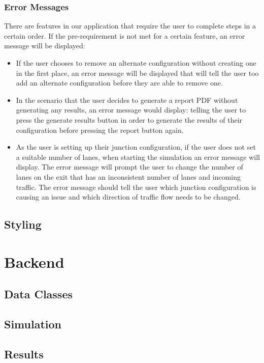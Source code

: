 \documentclass{article}
\begin{document}
    \subsubsection{Error Messages}
    There are features in our application that require the user to complete steps in a certain order. If the pre-requirement is not met for a certain feature, an error message will be displayed:
    \begin{itemize}
        \item If the user chooses to remove an alternate configuration without creating one in the first place, an error message will be displayed that will tell the user too add an alternate configuration before they are able to remove one.
        \item In the scenario that the user decides to generate a report PDF without generating any results, an error message would display: telling the user to press the generate results button in order to generate the results of their configuration before pressing the report button again.
        \item As the user is setting up their junction configuration, if the user does not set a suitable number of lanes, when starting the simulation an error message will display. The error message will prompt the user to change the number of lanes on the exit that has an inconsistent number of lanes and incoming traffic. The error message should tell the user which junction configuration is causing an issue and which direction of traffic flow needs to be changed.
    \end{itemize}

    \subsection{Styling}

\section{Backend}

    \subsection{Data Classes}

    \subsection{Simulation}

    \subsection{Results}
\end{document}
